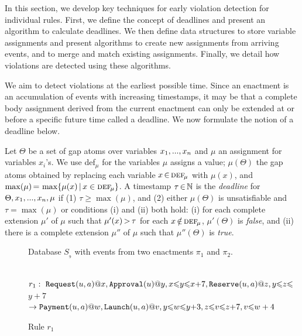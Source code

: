 In this section,
we develop key techniques for
early violation detection for individual rules.
First,
we define the concept of deadlines
and present an algorithm to calculate deadlines.
We then define data structures
to store variable assignments and
present algorithms
to create new assignments from arriving events,
and to merge and match existing assignments.
Finally,
we detail how violations are detected
using these algorithms.

\smallskip

We aim to detect violations
at the earliest possible time.
Since an enactment is an accumulation of
events with increasing timestamps,
it may be that
a complete body assignment derived
from the current enactment
can only be extended
at or before a specific future time
called a deadline.
We now formulate the notion of a deadline below.

\begin{deff}
  Let $\Theta$ be a set of gap atoms over variables
  $x_1,...,x_{n}$ and $\mu$ an assignment for variables $x_i$'s.
  We use {\sc def}$_{\!\mu}$ for the
  variables $\mu$ assigns a value;
  $\mu(\Theta)$ the gap atoms obtained
  by replacing each variable $x\,{\in}\, \textsc{def}_{\!\mu}$
  with $\mu(x)$,
  and $\max(\mu)\,{=}\,\max\{\mu(x)\,{|}\, x\in \textsc{def}_{\!\mu}\}$.
  A timestamp $\tau\,{\in}\,\mathbb{N}$ is
  the {\em deadline} for $\Theta, x_1,...,x_{n}, \mu$
  if
  (1) $\tau{\ge}\max(\mu)$,
  and
  (2) either
  $\mu(\Theta)$ is unsatisfiable and $\tau{=}\max(\mu)$
  or
  conditions (i) and (ii) both hold:
  (i) for each complete extension $\mu'$ of $\mu$
  such that
  $\mu'(x)\,{>}\,\tau$ for each $x\,{\notin}\,\textsc{def}_{\!\mu}$,
  $\mu'(\Theta)$ is {\sl false}, and
  (ii) there is a complete extension $\mu''$ of $\mu$
  such that $\mu''(\Theta)$ is {\sl true}.
\end{deff}

\begin{figure}[ht]
  \centering
  {}
  \caption{\normalsize Database $S_{_9}$ with events from two enactments $\pi_1$ and $\pi_2$.}
  \label{fig:example_state}
\end{figure}

\begin{figure}[!ht]
\begin{center}
  \vspace*{-2mm}
~~~~~~~~~$r_1:\ \texttt{Request}(u,a)@x,
\texttt{Approval}(u)@y,
x {\leqslant} y {\leqslant} x {+} 7,
\texttt{Reserve}(u,a)@z,
y {\leqslant} z {\leqslant}$ $y{+}7$\\
$\rightarrow
\texttt{Payment}(u,a)@w,
\texttt{Launch}(u,a)@v,
y{\leqslant} w {\leqslant} y {+} 3,
z{\leqslant} v {\leqslant} z {+} 7,
v{\leqslant}w+4$
\vspace*{-2mm}
\end{center}
\caption{Rule $r_1$}
\label{fig:example_rule_r_1}
\end{figure}

